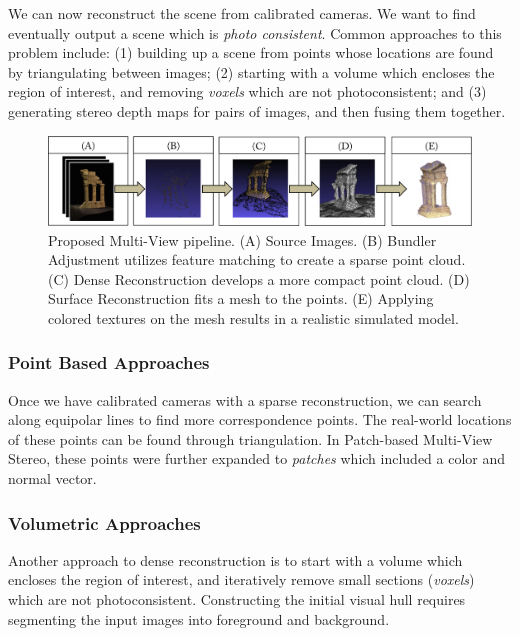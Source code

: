 \documentclass[10pt,twocolumn,letterpaper]{article}
\begin{document}
We can now reconstruct the scene from calibrated cameras. We want to find eventually output a scene which is \emph{photo consistent}. Common approaches to this problem include: (1) building up a scene from points whose locations are found by triangulating between images; (2) starting with a volume which encloses the region of interest, and removing \emph{voxels} which are not photoconsistent; and (3) generating stereo depth maps for pairs of images, and then fusing them together.\cite{furukawa}

\begin{figure}[t]
  \begin{center}
    \includegraphics[width=\linewidth]{pipeline3.png}

  \end{center}
  \caption{Proposed Multi-View pipeline. (A) Source Images. (B) Bundler Adjustment utilizes feature matching to create a sparse point cloud. (C) Dense Reconstruction develops a more compact point cloud. (D) Surface Reconstruction fits a mesh to the points. (E) Applying colored textures on the mesh results in a realistic simulated model.}
  \label{fig:pipeline}

\end{figure}

\subsubsection{Point Based Approaches}

Once we have calibrated cameras with a sparse reconstruction, we can search along equipolar lines to find more correspondence points. The real-world locations of these points can be found through triangulation. In Patch-based Multi-View Stereo, these points were further expanded to \emph{patches} which included a color and normal vector.\cite{furukawa}

\subsubsection{Volumetric Approaches}

Another approach to dense reconstruction is to start with a volume which encloses the region of interest, and iteratively remove small sections (\emph{voxels}) which are not photoconsistent. Constructing the initial visual hull requires segmenting the input images into foreground and background.\cite{spacecarving}
\end{document}
